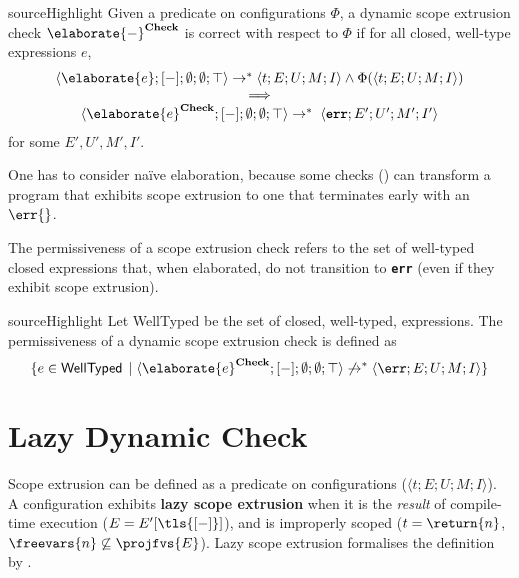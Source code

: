 \begin{definition}{sourceHighlight}
 Given a predicate on configurations $\Phi$, a dynamic scope extrusion check $\elaborate{-}^{\textbf{Check}}$ is correct with respect to $\Phi$ if for all closed, well-type \sourceLang{} expressions $e$,
 \[\begin{array}{c} \langle \elaborate{e} ; [-]; \emptyset;\emptyset; \top \rangle \to^{*} \langle t;E;U;M;I \rangle \land \Phi(\langle t;E;U;M;I \rangle)
\\ \implies \\
\langle \elaborate{e}^{\textbf{Check}} ; [-]; \emptyset;\emptyset; \top \rangle  \to^{*} \; \langle \textbf{\texttt{err}};E';U';M';I' \rangle
 \end{array}
 \]
 for some $E', U', M', I'$. 
\end{definition}

One has to consider naïve elaboration, because some checks () can transform a program that exhibits scope extrusion to one that terminates early with an $\err{}$.

The permissiveness of a scope extrusion check refers to the set of well-typed closed \sourceLang{} expressions that, when elaborated, do not transition to \textbf{\texttt{err}} (even if they exhibit scope extrusion).

\begin{definition}{sourceHighlight}
 Let \textsf{WellTyped} be the set of closed, well-typed, \sourceLang{} expressions.
 The permissiveness of a dynamic scope extrusion check is defined as 
 \[\{ e \in \textsf{WellTyped}\, \mid \langle \elaborate{e}^{\textbf{Check}};[-];\emptyset;\emptyset;\top \rangle \not\to^{*} \langle \err ; E ; U ; M ; I \rangle \} \]
\end{definition}

\section{Lazy Dynamic Check}\label{section:lazy-dynamic-check-formal}
Scope extrusion can be defined as a predicate on \coreLang{} configurations ($\langle t;E;U;M;I\rangle$). A configuration exhibits \textbf{lazy scope extrusion} when it is the \textit{result} of compile-time execution ($E = E'[\tls{[-]}]$), and is improperly scoped ($t = \return{n}$, $\freevars{n} \not\subseteq \projfvs{E}$). Lazy scope extrusion formalises the definition by \citet{kiselyov-14}.

